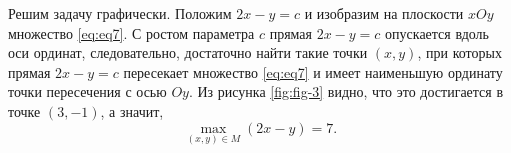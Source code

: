 Решим задачу графически. Положим $2x-y=c$ и изобразим на плоскости $xOy$ множество \ref{eq:eq7}. С ростом параметра $c$ прямая $2x-y=c$ опускается вдоль оси ординат, следовательно, достаточно найти такие точки $(x, y)$, при которых прямая $2x-y=c$ пересекает множество \ref{eq:eq7} и имеет наименьшую ординату точки пересечения с осью $Oy$. Из рисунка \ref{fig:fig-3} видно, что это достигается в точке $(3, -1)$, а значит, 
\[
\max_{(x, y) \in M}(2x-y) = 7.
\]

































